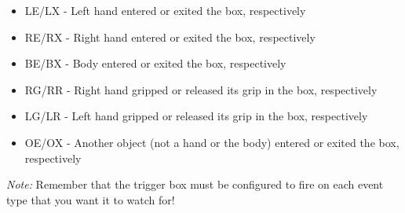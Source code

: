 \begin{itemize}
\item{LE/LX} - Left hand entered or exited the box, respectively
\item{RE/RX} - Right hand entered or exited the box, respectively
\item{BE/BX} - Body entered or exited the box, respectively
\item{RG/RR} - Right hand gripped or released its grip in the box, respectively
\item{LG/LR} - Left hand gripped or released its grip in the box, respectively
\item{OE/OX} - Another object (not a hand or the body) entered or exited the box, respectively
\end{itemize}

\textit{Note:} Remember that the trigger box must be configured to fire on each event type that you want it to watch for!
	
